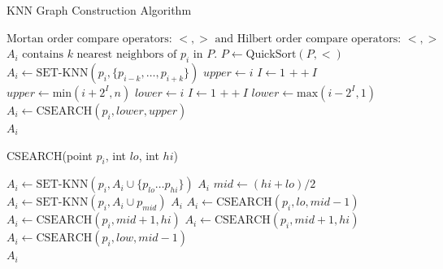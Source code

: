\documentclass[10pt]{article}
\begin{document}
\begin{algorithm}
  \caption{KNN Graph Construction Algorithm}
  \label{knn-graph-alg}
  \begin{algorithmic}[1]
    \Require $\text{Mortan order compare operators: } <, > 
    \text{ and Hilbert order compare operators: } <, >$
    \Ensure $A_i \text{ contains } k \text{ nearest neighbors of } p_i \text{ in } P \text{.}$
    \State $P \leftarrow \text{QuickSort}(P, <)$
    \State $A_i \leftarrow \text{SET-KNN}(p_i, \{p_{i-k}, \dots, p_{i+k} \})$
    \State $upper \leftarrow i$
    \Else
    \State $I \leftarrow 1$
    \State $++I$
    \EndWhile
    \State $upper \leftarrow \text{min}(i+2^I, n)$
    \EndIf
    \State $lower \leftarrow i$
    \Else
    \State $I \leftarrow 1$
    \State $++I$
    \EndWhile
    \State $lower \leftarrow \text{max}(i-2^I, 1)$
    \EndIf
    \State $A_i \leftarrow \text{CSEARCH}(p_i, lower, upper)$
    \EndIf
    \EndFor \\
    \Return $A_i$
  \end{algorithmic}
\end{algorithm}

\begin{algorithm}
  \caption{CSEARCH(point $p_i$, int $lo$, int $hi$)}
  \label{csearch}
  \begin{algorithmic}[1]
    \State $A_i \leftarrow \text{SET-KNN}(p_i, A_i \cup \{ p_{lo} \dots p_{hi} \})$
    \Return $A_i$
    \EndIf
    \State $mid \leftarrow (hi+lo)/2$
    \State $A_i \leftarrow \text{SET-KNN}(p_i, A_i \cup p_{mid})$
    \Return $A_i$
    \EndIf
    \State $A_i \leftarrow \text{CSEARCH}(p_i, lo, mid-1)$
    \State $A_i \leftarrow \text{CSEARCH}(p_i, mid+1, hi)$
    \EndIf
    \Else
    \State $A_i \leftarrow \text{CSEARCH}(p_i, mid+1, hi)$
    \State $A_i \leftarrow \text{CSEARCH}(p_i, low, mid - 1)$
    \EndIf
    \EndIf \\
    \Return $A_i$
    
  \end{algorithmic}
\end{algorithm}
\end{document}
